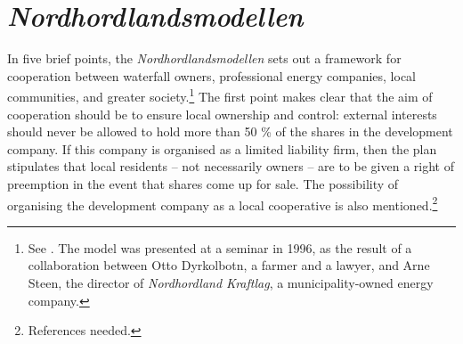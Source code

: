 
\section{{\it Nordhordlandsmodellen}}

In five brief points, the {\it Nordhordlandsmodellen} sets out a framework for cooperation between waterfall owners, professional energy companies, local communities, and greater society.\footnote{See \cite{dyrkolbotn96}. The model was presented at a seminar in 1996, as the result of a collaboration between Otto Dyrkolbotn, a farmer and a lawyer, and Arne Steen, the director of {\it Nordhordland Kraftlag}, a municipality-owned energy company.} %
The first point makes clear that the aim of cooperation should be to ensure local ownership and control: external interests should never be allowed to hold more than 50 \% of the shares in the development company. If this company is organised as a limited liability firm, then the plan stipulates that local residents -- not necessarily owners -- are to be given a right of preemption in the event that shares come up for sale. The possibility of organising the development company as a local cooperative is also mentioned.\footnote{References needed.}

